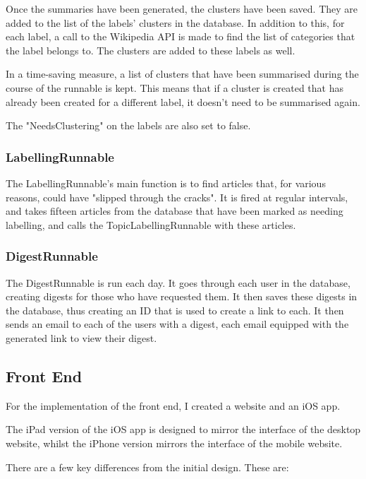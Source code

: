 \documentclass[12pt]{article}
\begin{document}
Once the summaries have been generated, the clusters have been saved. They are added to the list of the labels' clusters in the database. In addition to this, for each label, a call to the Wikipedia API is made to find the list of categories that the label belongs to. The clusters are added to these labels as well.

In a time-saving measure, a list of clusters that have been summarised during the course of the runnable is kept. This means that if a cluster is created that has already been created for a different label, it doesn't need to be summarised again.

The "NeedsClustering" on the labels are also set to false.

\subsubsection{LabellingRunnable}

The LabellingRunnable's main function is to find articles that, for various reasons, could have "slipped through the cracks". It is fired at regular intervals, and takes fifteen articles from the database that have been marked as needing labelling, and calls the TopicLabellingRunnable with these articles.

\subsubsection{DigestRunnable}

The DigestRunnable is run each day. It goes through each user in the database, creating digests for those who have requested them. It then saves these digests in the database, thus creating an ID that is used to create a link to each. It then sends an email to each of the users with a digest, each email equipped with the generated link to view their digest.

\subsection{Front End}

\label{frontendimplementation}

For the implementation of the front end, I created a website and an iOS app.

The iPad version of the iOS app is designed to mirror the interface of the desktop website, whilst the iPhone version mirrors the interface of the mobile website. 

There are a few key differences from the initial design. These are:
\end{document}
